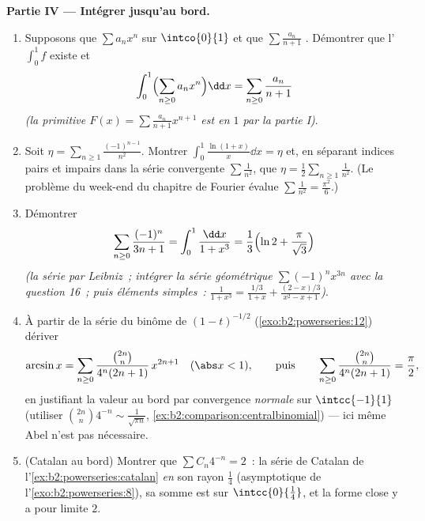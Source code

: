 \begin{problem}
\medskip
\noindent\textbf{Partie IV --- Intégrer jusqu'au bord.}
\begin{enumerate}[resume]
  \item Supposons que $\sum a_nx^n$  sur $\intco{0}{1}$ et
        que $\sum \frac{a_n}{n+1}$ . Démontrer que
        l' $\int_0^1 f$ existe et
        \[
        \int_0^1 \Bigl(\sum_{n\geq0} a_nx^n\Bigr)\dd x
        = \sum_{n\geq0}\frac{a_n}{n+1}
        \]
        \emph{(la primitive $F(x) = \sum\frac{a_n}{n+1}x^{n+1}$
        est  en $1$ par la partie I)}.
  \item Soit $\eta = \sum_{n\geq1}\frac{(-1)^{n-1}}{n^2}$. Montrer
        $\int_0^1 \frac{\ln(1+x)}{x}\dd x = \eta$ et, en
        séparant indices pairs et impairs dans la série 
        convergente $\sum \frac1{n^2}$, que $\eta =
        \frac12\sum_{n\geq1}\frac{1}{n^2}$. (Le problème du week-end du
        chapitre de Fourier évalue
        $\sum\frac1{n^2} = \frac{\pi^2}{6}$.)
  \item Démontrer
        \[
        \sum_{n\geq0}\frac{(-1)^n}{3n+1}
        = \int_0^1\frac{\dd x}{1+x^3}
        = \frac13\Bigl(\ln 2 + \frac{\pi}{\sqrt3}\Bigr)
        \]
        \emph{(la série  par Leibniz~; intégrer la
        série géométrique $\sum(-1)^nx^{3n}$ avec la question 16~;
        puis éléments simples~: $\frac{1}{1+x^3} =
        \frac{1/3}{1+x} + \frac{(2-x)/3}{x^2-x+1}$)}.
  \item À partir de la série du binôme de $(1-t)^{-1/2}$
        (\cref{exo:b2:powerseries:12}) dériver
        \[
        \arcsin x = \sum_{n\geq0}
        \frac{\binom{2n}{n}}{4^n(2n+1)}\,x^{2n+1}
        \quad(\abs x < 1),
        \qquad\text{puis}\qquad
        \sum_{n\geq0}\frac{\binom{2n}{n}}{4^n(2n+1)}
        = \frac\pi2 ,
        \]
        en justifiant la valeur au bord par convergence
        \emph{normale} sur $\intcc{-1}{1}$ (utiliser
        $\binom{2n}n4^{-n} \sim \frac{1}{\sqrt{\pi n}}$,
        \cref{ex:b2:comparison:centralbinomial}) --- ici même
        Abel n'est pas nécessaire.
  \item (Catalan au bord) Montrer que $\sum C_n 4^{-n} =
        2$~: la série de Catalan de
        l'\cref{ex:b2:powerseries:catalan}  \emph{en}
        son rayon $\frac14$ (asymptotique de
        l'\cref{exo:b2:powerseries:8}), sa somme est  sur
        $\intcc{0}{\frac14}$, et la forme close y a pour limite $2$.
\end{enumerate}


\end{problem}
